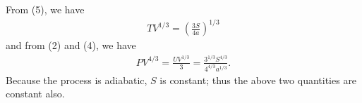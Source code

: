 \documentclass[a4paper,12pt]{article}
\begin{document}
\begin{enumerate}[label=\textbf{[\arabic*]}]
\begin{enumerate}
        \end{enumerate}

    \item
        From (5), we have
        \begin{align*}
            TV^{1/3} = \left( \frac{3S}{4a} \right)^{1/3}
        \end{align*}
        and from (2) and (4), we have
        \begin{align*}
            PV^{4/3} = \frac{UV^{1/3}}{3} = \frac{3^{1/3}S^{4/3}}{4^{4/3} a^{1/3}}.
        \end{align*}
        Because the process is adiabatic, $S$ is constant; thus the above two quantities are constant also.

\end{enumerate}
\end{document}
